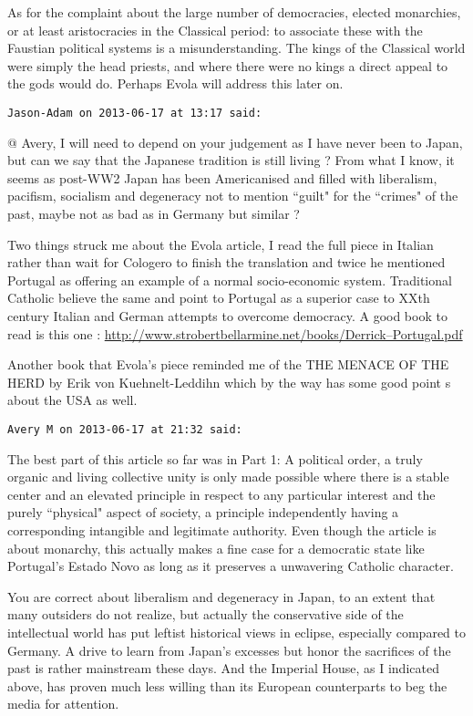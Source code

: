 \begin{footnotesize}
\begin{sffamily}
As for the complaint about the large number of democracies, elected monarchies, or at least aristocracies in the Classical period: to associate these with the Faustian political systems is a misunderstanding. The kings of the Classical world were simply the head priests, and where there were no kings a direct appeal to the gods would do. Perhaps Evola will address this later on.


\hfill

\texttt{Jason-Adam on 2013-06-17 at 13:17 said: }

@ Avery, I will need to depend on your judgement as I have never been to Japan, but can we say that the Japanese tradition is still living ? From what I know, it seems as post-WW2 Japan has been Americanised and filled with liberalism, pacifism, socialism and degeneracy not to mention ``guilt" for the ``crimes" of the past, maybe not as bad as in Germany but similar ? 

Two things struck me about the Evola article, I read the full piece in Italian rather than wait for Cologero to finish the translation and twice he mentioned Portugal as offering an example of a normal socio-economic system. Traditional Catholic believe the same and point to Portugal as a superior case to XXth century Italian and German attempts to overcome democracy. A good book to read is this one : \url{http://www.strobertbellarmine.net/books/Derrick–Portugal.pdf}

Another book that Evola's piece reminded me of the THE MENACE OF THE HERD by Erik von Kuehnelt-Leddihn which by the way has some good point s about the USA as well.


\hfill

\texttt{Avery M on 2013-06-17 at 21:32 said: }

The best part of this article so far was in Part 1: A political order, a truly organic and living collective unity is only made possible where there is a stable center and an elevated principle in respect to any particular interest and the purely ``physical" aspect of society, a principle independently having a corresponding intangible and legitimate authority. Even though the article is about monarchy, this actually makes a fine case for a democratic state like Portugal's Estado Novo as long as it preserves a unwavering Catholic character.

You are correct about liberalism and degeneracy in Japan, to an extent that many outsiders do not realize, but actually the conservative side of the intellectual world has put leftist historical views in eclipse, especially compared to Germany. A drive to learn from Japan's excesses but honor the sacrifices of the past is rather mainstream these days. And the Imperial House, as I indicated above, has proven much less willing than its European counterparts to beg the media for attention.


\end{sffamily}
\end{footnotesize}

